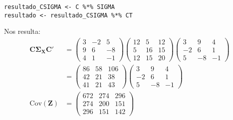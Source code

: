 \begin{sol}
\begin{verbatim}
resultado_CSIGMA <- C %*% SIGMA
resultado <- resultado_CSIGMA %*% CT
\end{verbatim}
Nos resulta:
\begin{align*}
\mathbf{C \Sigma_X C'} &= \begin{pmatrix}
3 & -2 & 5\\
9 & 6 & -8 \\
4 & 1 &-1
\end{pmatrix}
\begin{pmatrix}
12&5&12\\
5&16&15\\
12&15&20
\end{pmatrix}
\begin{pmatrix}
3 & 9 & 4\\
-2 & 6 & 1 \\
5 & -8 &-1
\end{pmatrix}\\
&= 
\begin{pmatrix}
86 & 58 & 106 \\
42 & 21 & 38 \\
41 & 21 & 43
\end{pmatrix}
\begin{pmatrix}
3 & 9 & 4\\
-2 & 6 & 1 \\
5 & -8 &-1
\end{pmatrix} \\
\text{Cov}(\mathbf{Z})&= 
\begin{pmatrix}
672 & 274 & 296 \\
274 & 200 &151 \\
296 &151 & 142
\end{pmatrix}
\end{align*}
\pagebreak


\end{sol}
